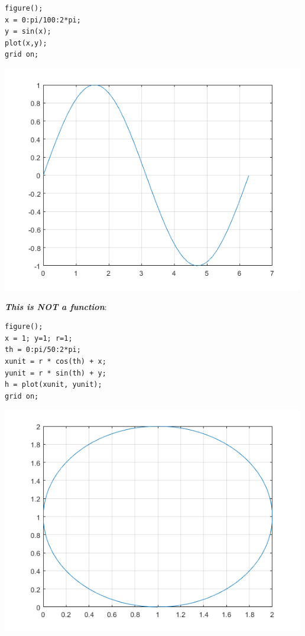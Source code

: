\documentclass[
]{book}
\begin{document}
\begin{verbatim}
figure();
x = 0:pi/100:2*pi;
y = sin(x);
plot(x,y);
grid on;
\end{verbatim}

\includegraphics[width=5.20833in,height=\textheight]{img/whatisfunction_images/figure_0.png}

\textbf{\emph{This is NOT a function}}:

\begin{verbatim}
figure();
x = 1; y=1; r=1;
th = 0:pi/50:2*pi;
xunit = r * cos(th) + x;
yunit = r * sin(th) + y;
h = plot(xunit, yunit);
grid on;
\end{verbatim}

\includegraphics[width=5.20833in,height=\textheight]{img/whatisfunction_images/figure_1.png}
\end{document}
